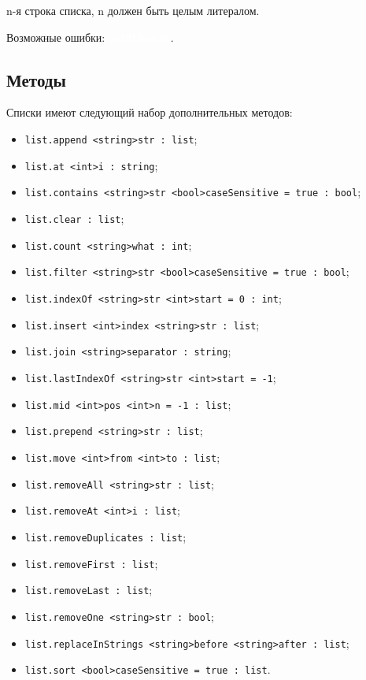 \documentclass[a4paper, 14pt]{extarticle}
\newcommand{\ferror}[1]{{\fontsize{11pt}{12pt} \tt \colorbox{function}{\textcolor{white}{#1}}}}
\newenvironment{icItems}
	{ \begin{itemize} [noitemsep,nolistsep] }
	{ \end{itemize} }
\begin{document}
n-я строка списка, n должен быть целым литералом.

Возможные ошибки: \ferror{OutOfBounds}.

\subsection{Методы}

Списки имеют следующий набор дополнительных методов:
\begin{icItems}
\item \lstinline|list.append <string>str : list|;
\item \lstinline|list.at <int>i : string|;
\item \lstinline|list.contains <string>str <bool>caseSensitive = true : bool|;
\item \lstinline|list.clear : list|;
\item \lstinline|list.count <string>what : int|;
\item \lstinline|list.filter <string>str <bool>caseSensitive = true : bool|;
\item \lstinline|list.indexOf <string>str <int>start = 0 : int|;
\item \lstinline|list.insert <int>index <string>str : list|;
\item \lstinline|list.join <string>separator : string|;
\item \lstinline|list.lastIndexOf <string>str <int>start = -1|;
\item \lstinline|list.mid <int>pos <int>n = -1 : list|;
\item \lstinline|list.prepend <string>str : list|;
\item \lstinline|list.move <int>from <int>to : list|;
\item \lstinline|list.removeAll <string>str : list|;
\item \lstinline|list.removeAt <int>i : list|;
\item \lstinline|list.removeDuplicates : list|;
\item \lstinline|list.removeFirst : list|;
\item \lstinline|list.removeLast : list|;
\item \lstinline|list.removeOne <string>str : bool|;
\item \lstinline|list.replaceInStrings <string>before <string>after : list|;
\item \lstinline|list.sort <bool>caseSensitive = true : list|.
\end{icItems}
\end{document}
